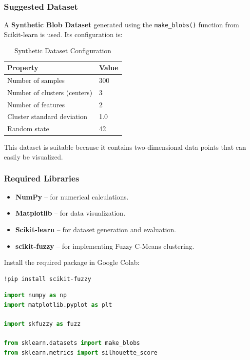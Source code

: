 \documentclass[a4paper,11pt]{article}
\begin{document}
\subsubsection{Suggested Dataset}
A \textbf{Synthetic Blob Dataset} generated using the \texttt{make\_blobs()} function from Scikit-learn is used. Its configuration is:

\begin{table}[H]
\centering
\caption{Synthetic Dataset Configuration}
\begin{tabular}{ll}
\toprule
\textbf{Property} & \textbf{Value} \\
\midrule
Number of samples            & 300 \\
Number of clusters (centers) & 3 \\
Number of features           & 2 \\
Cluster standard deviation   & 1.0 \\
Random state                 & 42 \\
\bottomrule
\end{tabular}
\end{table}

This dataset is suitable because it contains two-dimensional data points that can easily be visualized.

\subsubsection{Required Libraries}
\begin{itemize}
    \item \textbf{NumPy} -- for numerical calculations.
    \item \textbf{Matplotlib} -- for data visualization.
    \item \textbf{Scikit-learn} -- for dataset generation and evaluation.
    \item \textbf{scikit-fuzzy} -- for implementing Fuzzy C-Means clustering.
\end{itemize}

Install the required package in Google Colab:
\begin{lstlisting}[language=Python, caption={Install scikit-fuzzy}]
!pip install scikit-fuzzy
\end{lstlisting}

\begin{lstlisting}[language=Python, caption={Required Imports}]
import numpy as np
import matplotlib.pyplot as plt

import skfuzzy as fuzz

from sklearn.datasets import make_blobs
from sklearn.metrics import silhouette_score
\end{lstlisting}
\end{document}
